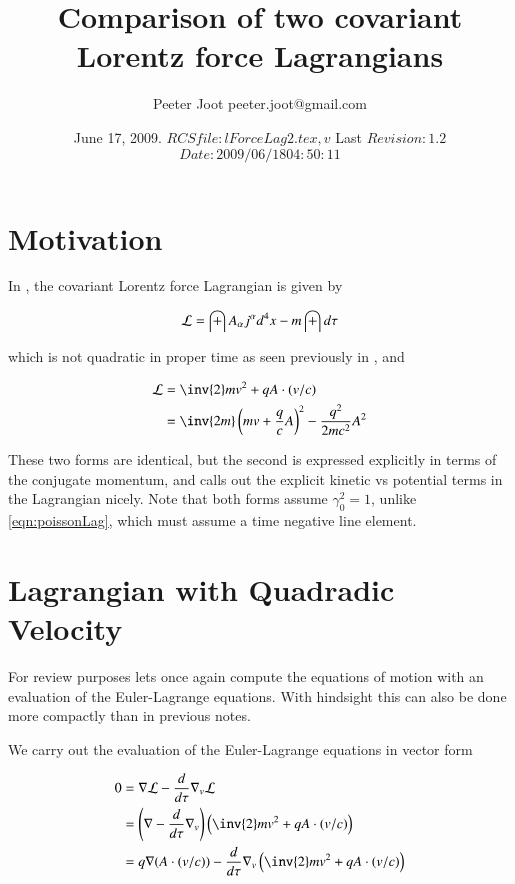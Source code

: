 \documentclass{article}
\title{Comparison of two covariant Lorentz force Lagrangians}
\author{Peeter Joot \quad peeter.joot@gmail.com }
\date{ June 17, 2009.  $RCSfile: lForceLag2.tex,v $ Last $Revision: 1.2 $ $Date: 2009/06/18 04:50:11 $ }
\begin{document}
\maketitle{}
\tableofcontents
\section{Motivation}

In \cite{poisson1999ild}, 
the covariant Lorentz force Lagrangian is given by

\begin{align}\label{eqn:poissonLag}
\mathcal{L} = \int A_\alpha j^\alpha d^4 x - m \int d\tau
\end{align}

which is not quadratic in proper time as seen previously in
\cite{PJSrLorentzForce}
, and
\cite{lorentzForcePQA} 

\begin{align}
\LL
&= \inv{2} m v^2 + q A \cdot (v/c) \\
&= \inv{2 m}\left( m v + \frac{q}{c} A \right)^2 - \frac{q^2}{ 2 m c^2} A^2
\end{align}

These two forms are identical, but the second is expressed explicitly
in terms of the conjugate momentum, and calls out the explicit kinetic
vs potential terms in the Lagrangian nicely.  Note that both forms assume $\gamma_0^2 = 1$, unlike 
\ref{eqn:poissonLag}, which must assume a time negative line element.

\section{Lagrangian with Quadradic Velocity}

For review purposes lets once again compute the equations of motion 
with an evaluation of the Euler-Lagrange equations.  With hindsight
this can also be done more compactly than in previous notes.

We carry out the evaluation of the Euler-Lagrange equations in vector form

\begin{align*}
0 
&= \grad \LL - \frac{d}{d\tau} \grad_v \LL \\
&= \left( \grad - \frac{d}{d\tau} \grad_v \right)
\left( \inv{2} m v^2 + q A \cdot (v/c) \right)
\\
&= q \grad (A \cdot (v/c))
- \frac{d}{d\tau} \grad_v 
\left( \inv{2} m v^2 + q A \cdot (v/c) \right)
\\
\end{align*}
\end{document}
